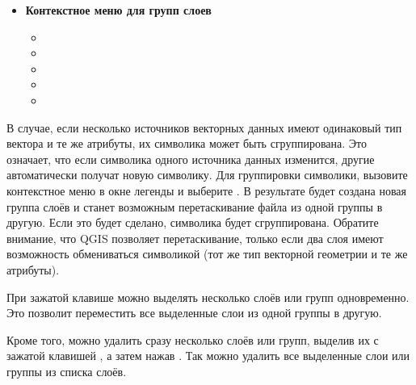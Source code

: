 \begin{itemize}
\item \textbf{Контекстное меню для групп слоев}
\begin{itemize}
\item {}
\item {}
\item {}
\item {}
\item {}
\end{itemize}

\end{itemize}

В случае, если несколько источников векторных данных имеют одинаковый
тип вектора и те же атрибуты, их символика может быть сгруппирована.
Это означает, что если символика одного источника данных изменится,
другие автоматически получат новую символику. Для группировки символики,
вызовите контекстное меню в окне легенды и выберите
. В результате будет создана новая группа слоёв
и станет возможным перетаскивание файла из одной группы в другую. Если это будет
сделано, символика будет сгруппирована. Обратите внимание, что QGIS
позволяет перетаскивание, только если два слоя имеют возможность
обмениваться символикой (тот же тип векторной геометрии и те же атрибуты).

При зажатой клавише  можно выделять несколько слоёв или
групп одновременно. Это позволит переместить все выделенные слои из одной
группы в другую.

Кроме того, можно удалить сразу несколько слоёв или групп, выделив их с
зажатой клавишей , а затем нажав .
Так можно удалить все выделенные слои или группы из списка слоёв.

%

